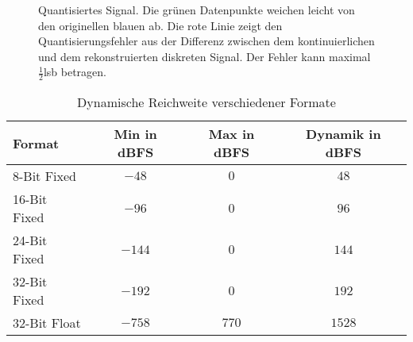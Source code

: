 \begin{figure}[]
    \centering
    \caption[Quantisiertes Signal]{Quantisiertes Signal. Die grünen Datenpunkte weichen leicht von den originellen blauen ab. Die rote Linie zeigt den Quantisierungsfehler aus der Differenz zwischen dem kontinuierlichen und dem rekonstruierten diskreten Signal. Der Fehler kann maximal $\frac{1}{2}$\gls{lsb} betragen.}
    \label{fig:quantized-signal}
\end{figure}

\begin{table}[]
    \centering
    \caption[Dynamische Reichweite verschiedener Formate]{Dynamische Reichweite verschiedener Formate}
    \begin{tabular}{|l|c|c|c|}
        \hline
        \textbf{Format} & \textbf{Min} in \gls{dBFS} & \textbf{Max} in \gls{dBFS} & \textbf{Dynamik} in \gls{dBFS} \\ \hline \hline
        8-Bit Fixed & $-48$ & $0$ & $48$ \\ \hline
        16-Bit Fixed & $-96$ & $0$ & $96$ \\ \hline
        24-Bit Fixed & $-144$ & $0$ & $144$ \\ \hline
        32-Bit Fixed & $-192$ & $0$ & $192$ \\ \hline
        32-Bit Float & $-758$ & $770$ & $1528$ \\ \hline
    \end{tabular}
    \label{tab:dynamic-range}
\end{table}

